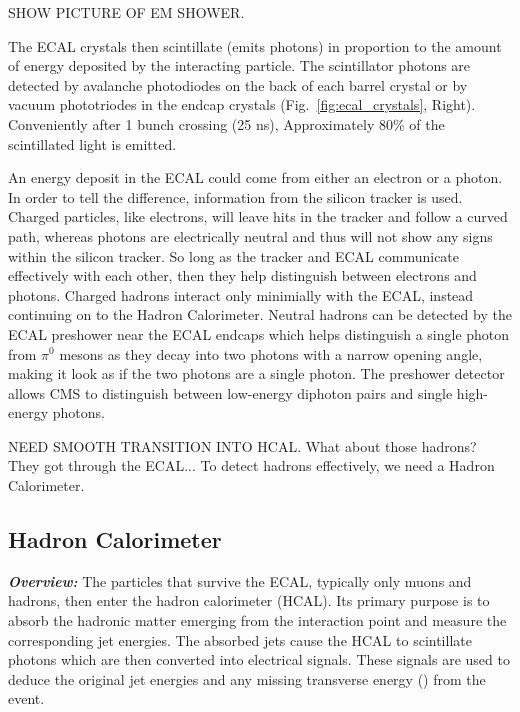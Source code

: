 SHOW PICTURE OF EM SHOWER.

The ECAL crystals then scintillate (emits photons) in proportion to the amount of energy deposited by the interacting particle. 
The scintillator photons are detected by avalanche photodiodes on the back of each barrel crystal or by vacuum phototriodes in the endcap crystals (Fig.~\ref{fig:ecal_crystals}, Right).
Conveniently after 1 bunch crossing (25 ns), Approximately 80\% of the scintillated light is emitted.

An energy deposit in the ECAL could come from either an electron or a photon.
In order to tell the difference, information from the silicon tracker is used.
Charged particles, like electrons, will leave hits in the tracker and follow a curved path, whereas photons are electrically neutral and thus will not show any signs within the silicon tracker.
So long as the tracker and ECAL communicate effectively with each other, then they help distinguish between electrons and photons.
Charged hadrons interact only minimially with the ECAL, instead continuing on to the Hadron Calorimeter.
Neutral hadrons can be detected by the ECAL preshower near the ECAL endcaps which helps distinguish a single photon from $\pi^{0}$ mesons as they decay into two photons with a narrow opening angle, making it look as if the two photons are a single photon.
The preshower detector allows CMS to distinguish between low-energy diphoton pairs and single high-energy photons.

NEED SMOOTH TRANSITION INTO HCAL. What about those hadrons? They got through the ECAL... To detect hadrons effectively, we need a Hadron Calorimeter.

\subsection{Hadron Calorimeter}
\label{subsec:hcal}

\textit{\textbf{Overview:}}
The particles that survive the ECAL, typically only muons and hadrons, then enter the hadron calorimeter (HCAL).
Its primary purpose is to absorb the hadronic matter emerging from the interaction point and measure the corresponding jet energies.
The absorbed jets cause the HCAL to scintillate photons which are then converted into electrical signals.
These signals are used to deduce the original jet energies and any missing transverse energy (\MET) from the event.

